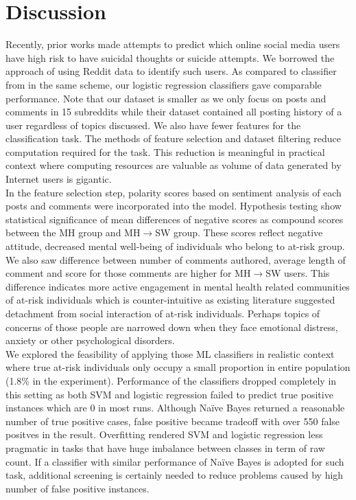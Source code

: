 \section{Discussion}
Recently, prior works \cite{Coppersmith2016, DeChoudhury2016} made attempts to predict which online social media users have high risk to have suicidal thoughts or suicide attempts. We borrowed the approach of using Reddit data to identify such users. As compared to classifier from \cite{DeChoudhury2016} in the same scheme, our logistic regression classifiers gave comparable performance. Note that our dataset is smaller as we only focus on posts and comments in 15 subreddits while their dataset contained all posting history of a user regardless of topics discussed. We also have fewer features for the classification task. The methods of feature selection and dataset filtering reduce computation required for the task. This reduction is meaningful in practical context where computing resources are valuable as volume of data generated by Internet users is gigantic.\\
In the feature selection step, polarity scores based on sentiment analysis of each posts and comments were incorporated into the model. Hypothesis testing show statistical significance of mean differences of negative scores as compound scores between the MH group and MH$\rightarrow$SW group. These scores reflect negative attitude, decreased mental well-being of individuals who belong to at-risk group. We also saw difference between number of comments authored, average length of comment and score for those comments are higher for MH$\rightarrow$SW users. This difference indicates more active engagement in mental health related communities of at-risk individuals which is counter-intuitive as existing literature \cite{Coppersmith2014} suggested detachment from social interaction of at-risk individuals. Perhaps topics of concerns of those people are narrowed down when they face emotional distress, anxiety or other psychological disorders.\\
We explored the feasibility of applying those ML classifiers in realistic context where true at-risk individuals only occupy a small proportion in entire population (1.8\% in the experiment). Performance of the classifiers dropped completely in this setting as both SVM and logistic regression failed to predict true positive instances which are 0 in most runs. Although Na\"ive Bayes returned a reasonable number of true positive cases, false positive became tradeoff with over 550 false positves in the result. Overfitting rendered SVM and logistic regression less pragmatic in tasks that have huge imbalance between classes in term of raw count. If a classifier with similar performance of  Na\"ive Bayes is adopted for such task, additional screening is certainly needed to reduce problems caused by high number of false positive instances.\\
